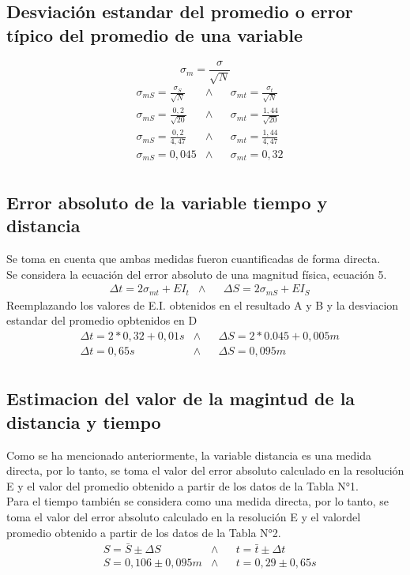 \documentclass[runningheads]{llncs}
\begin{document}
\subsection{Desviación estandar del promedio o error típico del promedio de una variable} 
    \begin{equation}
        \sigma_{m}=\frac{\sigma}{\sqrt{N}}
    \end{equation}
    \begin{align*}
        &\sigma_{mS}=\frac{\sigma_{S}}{\sqrt{N}}
        &\wedge&
        &\sigma_{mt}=\frac{\sigma_{t}}{\sqrt{N}}\\
        &\sigma_{mS}=\frac{0,2}{\sqrt{20}}
        &\wedge&
        &\sigma_{mt}=\frac{1,44}{\sqrt{20}}\\
        &\sigma_{mS}=\frac{0,2}{4,47}
        &\wedge&
        &\sigma_{mt}=\frac{1,44}{4,47}\\
        &\sigma_{mS}=0,045
        &\wedge&
        &\sigma_{mt}=0,32 \tag{D}\\
    \end{align*}
\subsection{Error absoluto de la variable tiempo y distancia}
Se toma en cuenta que ambas medidas fueron cuantificadas de forma directa.\\
Se considera la ecuación del error absoluto de una magnitud física, ecuación 5.\\ 
    \begin{align*}
        &\Delta t=2\sigma_{mt}+EI_{t}
        &\wedge&
        &\Delta S=2\sigma_{mS}+EI_{S}
    \end{align*}
    Reemplazando los valores de E.I. obtenidos en el resultado A y B y la desviacion estandar del promedio opbtenidos en D
    \begin{align*}
        &\Delta t=2*0,32+0,01 s
        &\wedge&
        &\Delta S=2*0.045+0,005 m\\
        &\Delta t=0,65 s
        &\wedge&
        &\Delta S=0,095 m \tag{E}\\
    \end{align*}
\subsection{Estimacion del valor de la magintud de la distancia y tiempo}
Como se ha mencionado anteriormente, la variable distancia es una medida directa, por lo tanto, se toma el valor del error absoluto calculado en la resolución E y el valor del promedio obtenido a partir de los datos de la Tabla N°1.\\
Para el tiempo también se considera como una medida directa, por lo tanto, se toma el valor del error absoluto calculado en la resolución E y el valordel promedio obtenido a partir de los datos de la Tabla N°2.\\
    \begin{align*}
        &S=\bar{S}\pm \Delta S
        &\wedge&
        &t=\bar{t}\pm \Delta t\\
        &S=0,106\pm 0,095 m
        &\wedge&
        &t=0,29\pm 0,65 s \tag{F}\\
    \end{align*}
\end{document}
